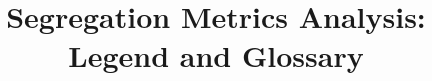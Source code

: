 \documentclass[11pt]{article}
\begin{document}
\title{Segregation Metrics Analysis: Legend and Glossary}
\author{}
\date{}
\maketitle


\end{document}
